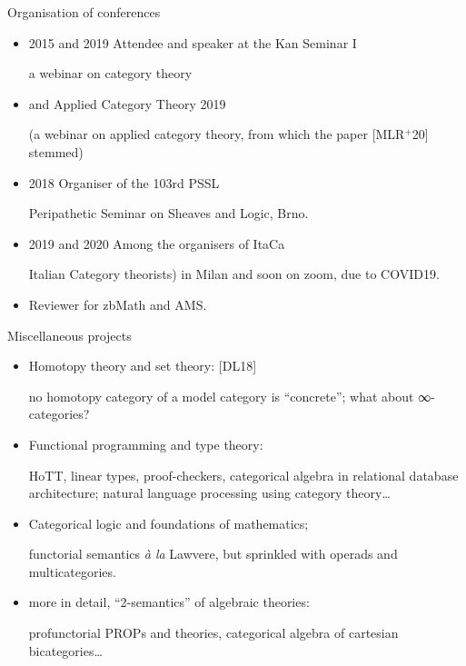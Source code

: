 \documentclass[handout]{beamer}
\def\lnk#1{\href{#1}{\faFilePdfO}}
\begin{document}
\begin{frame}{Organisation of conferences}\small
  \begin{itemize}
    \item<+-> 2015 and 2019 Attendee and speaker at the \alert{Kan Seminar I}

    {\footnotesize\color{gray!40} a webinar on category theory}
    \item<+-> and \alert{Applied Category Theory} 2019

    {\footnotesize\color{gray!40} (a webinar on applied category theory, from which the paper [\alert{MLR$^{+}$20}\lnk{https://arxiv.org/abs/2001.07488}] stemmed)}
    \item<+-> 2018 \alert{Organiser} of the 103rd \alert{PSSL}

    {\footnotesize\color{gray!40} Peripathetic Seminar on Sheaves and Logic, Brno.}
    \item<+-> 2019 and 2020 Among the \alert{organisers} of ItaCa

    {\footnotesize\color{gray!40}  \alert{Ita}lian \alert{Ca}tegory theorists) in Milan and soon on zoom, due to COVID19.}
    \item<+-> Reviewer for zbMath and AMS.
  \end{itemize}
\end{frame}
%
%
%
%
%
%
%
\begin{frame}{Miscellaneous projects}
\small
\begin{itemize}
  \item<+-> Homotopy theory and set theory: [\alert{DL18}\lnk{https://link.springer.com/article/10.1007/s40062-018-0197-3}]

  {\color{gray!70}\footnotesize  no homotopy category of a model category is ``concrete''; what about ∞-categories?}
  \item<+-> Functional programming and type theory:

  {\color{gray!70}\footnotesize  HoTT, linear types, proof-checkers, categorical algebra in relational database architecture; natural language processing using category theory\dots}
  \item<+-> Categorical logic and foundations of mathematics;

  {\color{gray!70}\footnotesize  functorial semantics \emph{à la} Lawvere, but sprinkled with operads and multicategories.}
  \item<+-> more in detail, ``2-semantics'' of algebraic theories:

  {\color{gray!70}\footnotesize profunctorial PROPs and theories, categorical algebra of cartesian bicategories\dots}
\end{itemize}
\end{frame}
\end{document}
